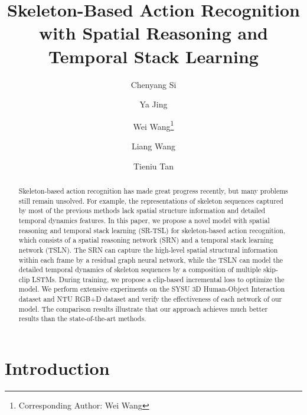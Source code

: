\documentclass[runningheads]{llncs}
\begin{document}
\title{Skeleton-Based Action Recognition with Spatial Reasoning and Temporal Stack Learning}

\author{Chenyang Si \and
Ya Jing \and
Wei Wang\thanks{Corresponding Author: Wei Wang} \and
Liang Wang \and
Tieniu Tan }

\maketitle              \begin{abstract}
Skeleton-based action recognition has made great progress recently, but many problems still remain unsolved. For example, the representations of skeleton sequences captured by most of the previous methods lack spatial structure information and detailed temporal dynamics features. In this paper, we propose a novel model with spatial reasoning and temporal stack learning (SR-TSL) for skeleton-based action recognition, which consists of a spatial reasoning network (SRN) and a temporal stack learning network (TSLN). The SRN can capture the high-level spatial structural information within each frame by a residual graph neural network, while the TSLN can model the detailed temporal dynamics of skeleton sequences by a composition of multiple skip-clip LSTMs. During training, we propose a clip-based incremental loss to optimize the model. We perform extensive experiments on the SYSU 3D Human-Object Interaction dataset and NTU RGB+D dataset and verify the effectiveness of each network of our model. The comparison results illustrate that our approach achieves much better results than the state-of-the-art methods.

\end{abstract}
\section{Introduction}
\end{document}
